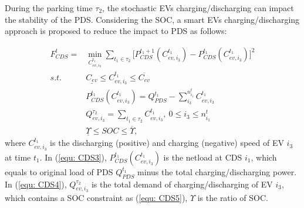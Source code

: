 \documentclass[final]{IEEEtran}
\begin{document}
During the parking time $\tau_2$, the stochastic EVs charging/discharging can impact the stability of the PDS. Considering the SOC, a smart EVs charging/discharging approach is proposed to reduce the impact to PDS as follows:

\begin{subequations}\label{equ:smart_EV}
	\begin{align}
	F^t_{CDS} = & \min_{C^{t_1}_{ev, i_3}} \sum_{t_1\in \tau_2} \bigg[P^{t_1+1}_{CDS} (C^{t_1}_{ev, i_3}) - P^{t_1}_{CDS} (C^{t_1}_{ev, i_3}) \bigg]^2  \label{equ: CDS1}\\
	s.t.\ \  & \underline{C_{ev}} \leq C^{t_1}_{ev, i_3} \leq \overline{C_{ev}} \label{equ: CDS2}\\
	& P^{t_1}_{CDS} (C^{t_1}_{ev, i_3}) = Q^{t_1}_{PDS} - \sum^{n^t_{i_1}}_{i_3} C^{t_1}_{ev, i_3} \label{equ: CDS3}\\
	& Q^{\tau_2}_{ev, i_3} = \sum_{t_1\in \tau_2}C^{t_1}_{ev, i_3}, \ 0 \leq i_3 \leq n^t_{i_1}  \label{equ: CDS4}\\
	&  \underline{\Upsilon} \leq SOC \leq  \overline{\Upsilon}, \  \label{equ: CDS5} 
	\end{align}
\end{subequations} 
where $C^{t_1}_{ev, i_3}$ is the discharging (positive) and charging (negative) speed of EV $i_3$ at time $t_1$. In (\ref{equ: CDS3}), $P^{t_1}_{CDS} (C^{t_1}_{ev, i_3})$ is the netload at CDS $i_1$, which equals to original load of PDS $Q^{t_1}_{PDS}$ minus the total charging/discharging power. In (\ref{equ: CDS4}), $Q^{\tau_2}_{ev, i_3}$ is the total demand of charging/discharging of EV $i_3$, which contains a SOC constraint as (\ref{equ: CDS5}),  $\Upsilon$ is the ratio of SOC. 
\end{document}
